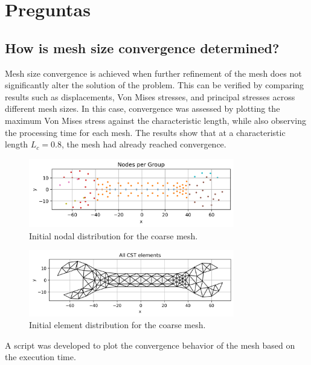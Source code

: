 \section{Preguntas}

\subsection{How is mesh size convergence determined?}

Mesh size convergence is achieved when further refinement of the mesh does not significantly alter the solution of the problem.  
This can be verified by comparing results such as displacements, Von Mises stresses, and principal stresses across different mesh sizes.  
In this case, convergence was assessed by plotting the maximum Von Mises stress against the characteristic length, while also observing the processing time for each mesh.  
The results show that at a characteristic length $L_c = 0.8$, the mesh had already reached convergence.

\begin{figure}[H]
    \centering
    \includegraphics[width=0.8\textwidth]{GRAFICOS/Initial_nodes_por_grupo.png}
    \caption{Initial nodal distribution for the coarse mesh.}
    \label{fig:initial_nodes}
\end{figure}
  
\begin{figure}[H]
    \centering
    \includegraphics[width=0.8\textwidth]{GRAFICOS/Initial_elementos.png}
    \caption{Initial element distribution for the coarse mesh.}
    \label{fig:initial_elements}
\end{figure}
  
A script was developed to plot the convergence behavior of the mesh based on the execution time.

